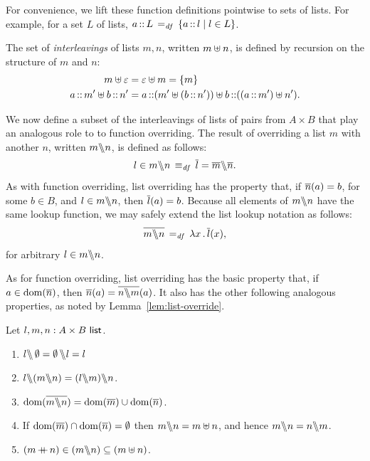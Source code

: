 \documentclass[11pt]{report}
\begin{document}
For convenience, we lift these function definitions pointwise to sets of lists. For example, for a set $L$ of lists, $a \lcons L \eqdef \setof{a \lcons l}{l \in L}$. 

The set of \emph{interleavings} of lists $m,n$, written $m \merge n$, is defined by recursion on the structure of $m$ and $n$: \begin{align*}
  m \merge \lnil & = \lnil \merge m = \set{m} \\ 
  a \lcons m' \merge b \lcons n' & = a \lcons (m' \merge (b\lcons n')) \uplus b \lcons ((a \lcons m') \merge n').
\end{align*}

We now define a subset of the interleavings of lists of pairs from $A \times B$ that play an analogous role to to function overriding. The result of overriding a list $m$ with another $n$, written $m \override n$, is defined as follows: \[ l \in m \override n \iffdef \funof{l} = \funof{m} \override \funof{n}.\] As with function overriding, list overriding has the property that, if $\funof{n}(a) = b$, for some $b \in B$, and $l \in m \override n$, then $\funof{l}(a) = b$. Because all elements of $m \override n$ have the same lookup function, we may safely extend the list lookup notation as follows: \[ \funof{m \override n} \eqdef \fun{x} \funof{l}(x),\] for arbitrary $l \in m \override n$. 

As for function overriding, list overriding has the basic property that, if $a \in \dom{\funof{n}}$, then $\funof{n}(a) = \funof{n \override m}(a)$. It also has the other following analogous properties, as noted by Lemma~\ref{lem:list-override}. 
\begin{lemma}
    \label{lem:list-override}
    Let $l,m,n : \listof{A \times B}$. 
    \begin{enumerate}
        \item $l \override \nil = \nil \override l = l$
        \item $l \override (m \override n) = (l \override m) \override n$. 
        \item $\dom{\funof{m \override n}} = \dom{\funof{m}} \cup \dom{\funof{n}}$. 
        \item If $\dom{\funof{m}} \cap \dom{\funof{n}} = \nil$ then $m \override n = m \merge n$, and hence $m \override n = n \override m$. 
        \item $(m \lapp n) \in (m \override n) \subseteq (m \merge n)$.
    \end{enumerate}
\end{lemma}
\end{document}
